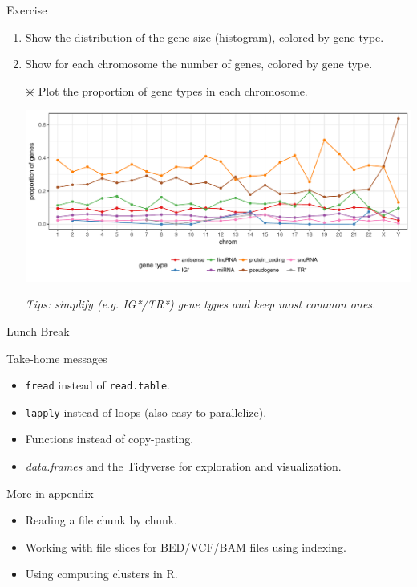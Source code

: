 \documentclass[10pt]{beamer}
\newcommand{\dfs}{{\it data.frames} }
\begin{document}
\begin{frame}{Exercise}
  \begin{enumerate}
  \item Show the distribution of the gene size (histogram), colored by gene type.
  \item Show for each chromosome the number of genes, colored by gene type.
    \bigskip
    
  \item[$\divideontimes$] Plot the proportion of gene types in each chromosome.

    \centering
    \includegraphics[height=.5\textheight]{../imgs/propGenesChr.pdf}

    {\it\scriptsize Tips: simplify (e.g. IG*/TR*) gene types and keep most common ones.}
  \end{enumerate}
\end{frame}

\begin{frame}[fragile]{Lunch Break}
  \begin{block}{Take-home messages}
    \begin{itemize}
    \item \verb!fread! instead of \verb!read.table!.
    \item \verb!lapply! instead of loops (also easy to parallelize).
    \item Functions instead of copy-pasting.
    \item \dfs and the Tidyverse for exploration and visualization.
    \end{itemize}
  \end{block}
  \begin{block}{More in appendix}
    \begin{itemize}
    \item Reading a file chunk by chunk.
    \item Working with file slices for BED/VCF/BAM files using indexing.
    \item Using computing clusters in R.
    \end{itemize}
  \end{block}
\end{frame}
\end{document}
